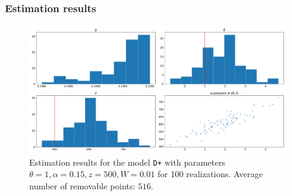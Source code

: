 \documentclass[c, 10pt]{beamer}
\begin{document}
\begin{frame}[noframenumbering]\frametitle{Estimation results}
	
\begin{figure}
  \centering
  \includegraphics[width=1\textwidth]{./FigureLayout/estimation-type_D+_theta_1}
  \caption{Estimation results for the model \texttt{D+} with parameters $\theta=1,\alpha=0.15,z=500,W=0.01$ for 100 realizations. Average number of removable points: $516$.}
\end{figure}

\end{frame}
\end{document}
